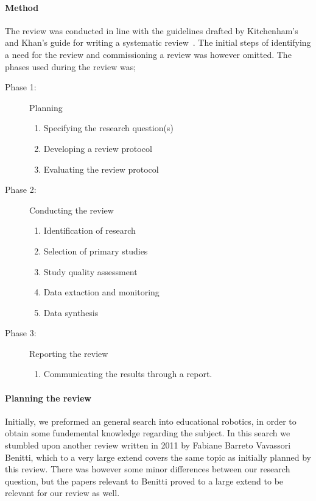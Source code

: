 \paragraph{Method}
The review was conducted in line with the guidelines drafted by Kitchenham's and Khan's guide for writing a systematic review~\cite{kitchenham2007guidelines,khan2001undertaking}. 
The initial steps of identifying a need for the review and commissioning a review was however omitted. 
The phases used during the review was; 
\begin{description}
	\item[Phase 1: ] Planning
		\begin{enumerate}
			\item Specifying the research question(s)
			\item Developing a review protocol
			\item Evaluating the review protocol
		\end{enumerate}
	\item[Phase 2: ] Conducting the review
		\begin{enumerate}
			\item Identification of research
			\item Selection of primary studies
			\item Study quality assessment
			\item Data extaction and monitoring
			\item Data synthesis
		\end{enumerate}
	\item[Phase 3: ] Reporting the review
		\begin{enumerate}
			\item Communicating the results through a report.
		\end{enumerate}
\end{description}

\paragraph{Planning the review}\label{sec:questions}
Initially, we preformed an general search into educational robotics, in order to obtain some fundemental knowledge regarding the subject. In this search we stumbled upon another review written in 2011 by Fabiane Barreto Vavassori Benitti\cite{Benitti2012978}, which to a very large extend covers the same topic as initially planned by this review. There was however some minor differences between our research question, but the papers relevant to Benitti proved to a large extend to be relevant for our review as well. 


